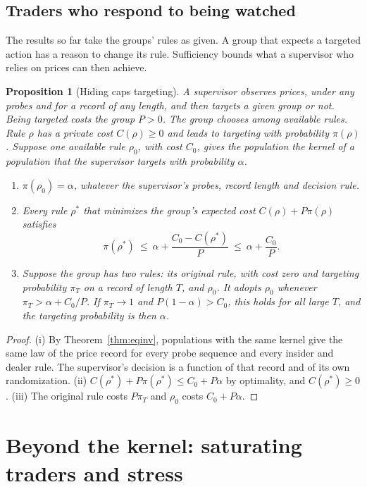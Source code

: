 \documentclass[12pt]{article}
\newtheorem{proposition}[theorem]{Proposition}
\theoremstyle{definition}
\theoremstyle{remark}
\begin{document}
\subsection{Traders who respond to being watched}\label{sec:hiding}

The results so far take the groups' rules as given. A group that expects a targeted action has a reason to change its rule. Sufficiency bounds what a supervisor who relies on prices can then achieve.

\begin{proposition}[Hiding caps targeting]\label{prop:hiding}
A supervisor observes prices, under any probes and for a record of any length, and then targets a given group or not. Being targeted costs the group $P>0$. The group chooses among available rules. Rule $\rho$ has a private cost $C(\rho)\ge0$ and leads to targeting with probability $\pi(\rho)$. Suppose one available rule $\rho_0$, with cost $C_0$, gives the population the kernel of a population that the supervisor targets with probability $\alpha$.
\begin{enumerate}[label=(\roman*),itemsep=1pt]
\item $\pi(\rho_0)=\alpha$, whatever the supervisor's probes, record length and decision rule.
\item Every rule $\rho^*$ that minimizes the group's expected cost $C(\rho)+P\pi(\rho)$ satisfies
\[
\pi(\rho^*)\ \le\ \alpha+\frac{C_0-C(\rho^*)}{P}\ \le\ \alpha+\frac{C_0}{P}.
\]
\item Suppose the group has two rules: its original rule, with cost zero and targeting probability $\pi_T$ on a record of length $T$, and $\rho_0$. It adopts $\rho_0$ whenever $\pi_T>\alpha+C_0/P$. If $\pi_T\to1$ and $P(1-\alpha)>C_0$, this holds for all large $T$, and the targeting probability is then $\alpha$.
\end{enumerate}
\end{proposition}

\begin{proof}
(i) By Theorem~\ref{thm:eqinv}, populations with the same kernel give the same law of the price record for every probe sequence and every insider and dealer rule. The supervisor's decision is a function of that record and of its own randomization. (ii) $C(\rho^*)+P\pi(\rho^*)\le C_0+P\alpha$ by optimality, and $C(\rho^*)\ge0$. (iii) The original rule costs $P\pi_T$ and $\rho_0$ costs $C_0+P\alpha$.
\end{proof}


\section{Beyond the kernel: saturating traders and stress}\label{sec:saturating}
\end{document}

